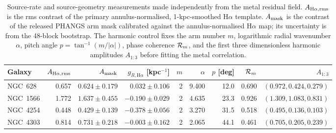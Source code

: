 \documentclass[fleqn,usenatbib]{mnras}
\begin{document}
\begin{table}
\centering
\scriptsize
\setlength{\tabcolsep}{3.6pt}
\caption{Source-rate and source-geometry measurements made independently from the metal residual field.  $A_{{\rm H}\alpha,{\rm rms}}$ is the rms contrast of the primary annulus-normalised, 1-kpc-smoothed H$\alpha$ template.  $A_{\rm mask}$ is the contrast of the released PHANGS arm mask calibrated against the annulus-normalised H$\alpha$ map; its uncertainty is from the 48-block bootstrap.  The harmonic control fixes the arm number $m$, logarithmic radial wavenumber $\alpha$, pitch angle $p=\tan^{-1}(m/|\alpha|)$, phase coherence ${\cal R}_m$, and the first three dimensionless harmonic amplitudes $A_{1:3}$ before fitting the metal correlation.}
\label{tab:phangs_spirals}
\begin{tabular}{@{}lrrrrrrrr@{}}
\toprule
Galaxy & $A_{{\rm H}\alpha,{\rm rms}}$ & $A_{\rm mask}$ & $g_{R,\mathrm{H}\alpha}$ [kpc$^{-1}$] & $m$ & $\alpha$ & $p$ [deg] & ${\cal R}_m$ & $A_{1:3}$\\
\midrule
NGC~628  & 0.657 & $0.624\pm0.179$ & $ 0.032\pm0.106$ & 2 & 9.400 & 12.0 & 0.690 & $(0.972,0.424,0.279)$\\
NGC~1566 & 1.772 & $1.637\pm0.455$ & $-0.190\pm0.029$ & 2 & 4.635 & 23.3 & 0.926 & $(1.309,1.083,0.831)$\\
NGC~4254 & 0.448 & $0.429\pm0.139$ & $-0.378\pm0.056$ & 2 & 3.270 & 31.5 & 0.518 & $(0.495,0.136,0.103)$\\
NGC~4303 & 0.814 & $0.731\pm0.218$ & $-0.003\pm0.162$ & 2 & 2.065 & 44.1 & 0.461 & $(0.705,0.205,0.239)$\\
\bottomrule
\end{tabular}
\end{table}
\end{document}
